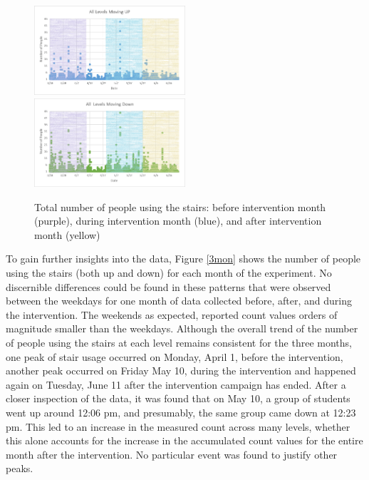 \begin{figure}[b]
    \includegraphics[width=0.5\textwidth]{image/Chapters/Chapter6/up.png}%
    \includegraphics[width=0.5\textwidth]{image/Chapters/Chapter6/down.png}
    \caption{Total number of people using the stairs: before intervention month (purple), during intervention month (blue), and after intervention month (yellow)}
    \label{updown}
\end{figure}



To gain further insights into the data, Figure \ref{3mon} shows the number of people using the stairs (both up and down) for each month of the experiment. No discernible differences could be found in these patterns that were observed between the weekdays for one month of data collected before, after, and during the intervention. The weekends as expected, reported count values orders of magnitude smaller than the weekdays. Although the overall trend of the number of people using the stairs at each level remains consistent for the three months, one peak of stair usage occurred on Monday, April 1, before the intervention, another peak occurred on Friday May 10, during the intervention and happened again on Tuesday, June 11 after the intervention campaign has ended.
After a closer inspection of the data, it was found that on May 10, a group of students went up around 12:06 pm, and presumably, the same group came down at 12:23 pm. This led to an increase in the measured count across many levels, whether this alone accounts for the increase in the accumulated count values for the entire month after the intervention. No particular event was found to justify other peaks. 


